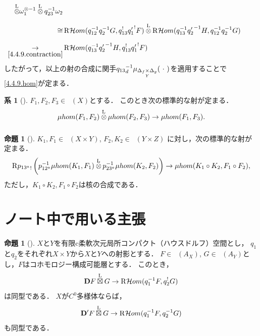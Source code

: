 \documentclass[leqno, 10pt, a4paper, dvipdfmx]{jsarticle}
\makeatletter
\theoremstyle{definition}
\renewenvironment{proof}[1][\proofname]{\par
  \pushQED{\qed}%
  \normalfont \topsep6\p@\@plus6\p@\relax
  \trivlist
  \item[\hskip\labelsep
         \bfseries
    {#1}]\ignorespaces
}{%
  \popQED\endtrivlist\@endpefalse
}
\renewcommand{\proofname}{証明.}
\numberwithin{equation}{section}
\newcommand{\Dompb}{\mathop{\mathsf{D}^\mathrm{b}}\nolimits}
\newcommand{\HOM}{\mathop{\mathcal{H}\hspace{-0pt}om}\nolimits}%
\newcommand{\RHOM}{\mathop{\mathrm{R}\hspace{-1.5pt}\HOM}\nolimits}
\newcommand{\Rder}{\mathrm{R}}
\newcommand{\vD}{\mathbf{D}}
\newcommand{\tens}[1][]{\mathbin{\otimes_{\raise1.5ex\hbox to-.1em{}{#1}}}}
\newcommand{\etens}{\mathbin{\boxtimes}}
\newcommand{\lltens}[1][]{\mathbin{{\mathop{\tens}\limits^{\mathrm{L}}_{#1}}}}
\newcommand{\letens}{\overset{\mathrm{L}}{\etens}}
\newcommand{\blk}{\mathord{\ \cdot\ }}
\newcommand{\dpb}[1][]{\mathbin{\mathop{\times}\limits_{#1}}}
\theoremstyle{mystyle}
\newtheorem{PRP}[AXM]{命題}
\newtheorem{CRL}[AXM]{系}
\renewenvironment{leftbar}{%
  \def\FrameCommand{\textcolor{lightgray}{\vrule width 4pt} \hspace{10pt}}%
  \MakeFramed {\advance\hsize-\width \FrameRestore}}%
{\endMakeFramed}
\newcommand{\mdiff}[1][]{{#1}_{d}} %
\newcommand{\muhom}{\mu hom}
\newcommand{\diag}[1][]{\Delta_{#1}}
\newcommand{\micro}[1]{\mu_{#1}\hspace{-0pt}}
\makeatother
\begin{document}
\begin{proof}
\begin{align*}
    \lltens[]
    \omega_{1}^{\otimes-1}
    \lltens[]q_{23}^{-1}\omega_{2}
    &&\text{}\\
    \cong&
      \RHOM(q_{12}^{-1}q_{2}^{-1}G,q_{13}^{!}{q'_{1}}^{!}F)
      \lltens[]
      \RHOM(
        q_{13}^{-1}{q_{2}'}^{-1}H,
        q_{12}^{-1}q_{2}^{-1}G
      )
    &&\text{}\\
    \underset{\eqref{4.4.9.contraction}}{\to}&
      \RHOM(
        q_{13}^{-1}{q_{2}'}^{-1}H,
        q_{13}^{!}{q'_{1}}^{!}F)
    &&\text{}
  \end{align*}
  したがって，以上の射の合成に関手\(
    \mdiff[{q_{13}}]^{-1}
    \micro{\diag[f]\dpb[Y]\diag[g]}(\blk)
  \)を適用することで\eqref{4.4.9.hom}が定まる．
\end{proof}

\begin{leftbar}
\begin{CRL}[{\cite[Cor.4.4.10]{KS90}}]
  \(F_1,F_2,F_3\in\Dompb(X)\)とする．
  このとき次の標準的な射が定まる．
  \[
    \muhom(F_1, F_2)
    \lltens[]
    \muhom(F_2, F_3)
    \to
    \muhom(F_1, F_3).
  \]
\end{CRL}
\end{leftbar}

\begin{leftbar}
\begin{PRP}[{\cite[Prop.4.4.11]{KS90}}]
  \(K_1, F_1\in\Dompb(X\times Y)\), 
  \(F_2,K_2\in\Dompb(Y\times Z)\)
  に対し，次の標準的な射が定まる．
  \begin{equation}
    \Rder{{p_{13^{a}}}_{!}}
    \left(
      p_{12^{a}}^{-1}\muhom(K_1,F_1)
      \lltens[]
      p_{23^{a}}^{-1}\muhom(K_2,F_2)
    \right)
    \to
    \muhom(K_1\circ K_2,F_1\circ F_2),
  \end{equation}
  ただし，\(K_1\circ K_2,F_1\circ F_2\)は核の合成である．
\end{PRP}
\end{leftbar}
















\clearpage
\appendix
\section{ノート中で用いる主張}
\begin{leftbar}
\begin{PRP}[{\cite[Prop.3.4.4.]{KS90}}]\label{prp3.4.4}
  \(X\)と\(Y\)を有限c柔軟次元局所コンパクト（ハウスドルフ）空間とし，
  \(q_1\)と\(q_2\)をそれぞれ\(X\times Y\)から\(X\)と\(Y\)への射影とする．
  \(F\in\Dompb(A_X)\), \(G\in\Dompb(A_Y)\)とし，\(F\)はコホモロジー構成可能層とする．
  このとき，
  \[
    \vD{F}\letens G\to \RHOM(q_1^{-1}F,q_2^{!}G)
  \]は同型である．
  \(X\)が\(C^0\)多様体ならば，\[
    \vD'{F}\letens G\to \RHOM(q_1^{-1}F,q_2^{-1}G)
  \]も同型である．
\end{PRP}
\end{leftbar}
\end{document}
